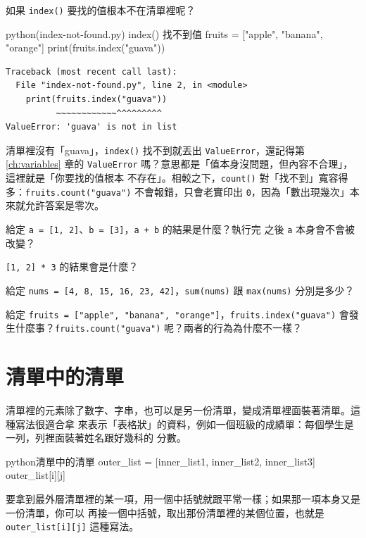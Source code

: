 如果 \texttt{index()} 要找的值根本不在清單裡呢？

\begin{example}{python}{(index-not-found.py) index() 找不到值}
fruits = ["apple", "banana", "orange"]
print(fruits.index("guava"))
\end{example}

\begin{verbatim}
Traceback (most recent call last):
  File "index-not-found.py", line 2, in <module>
    print(fruits.index("guava"))
          ~~~~~~~~~~~~^^^^^^^^^
ValueError: 'guava' is not in list
\end{verbatim}

清單裡沒有「guava」，\texttt{index()} 找不到就丟出 \texttt{ValueError}，還記得第 \ref{ch:variables} 章的
\texttt{ValueError} 嗎？意思都是「值本身沒問題，但內容不合理」，這裡就是「你要找的值根本
不存在」。相較之下，\texttt{count()} 對「找不到」寬容得多：\texttt{fruits.count("guava")}
不會報錯，只會老實印出 \texttt{0}，因為「數出現幾次」本來就允許答案是零次。

\begin{drills}[label=drills:list-tools]
\item 給定 \texttt{a = [1, 2]}、\texttt{b = [3]}，\texttt{a + b} 的結果是什麼？執行完
之後 \texttt{a} 本身會不會被改變？
\item \texttt{[1, 2] * 3} 的結果會是什麼？
\item 給定 \texttt{nums = [4, 8, 15, 16, 23, 42]}，\texttt{sum(nums)} 跟
\texttt{max(nums)} 分別是多少？
\item 給定 \texttt{fruits = ["apple", "banana", "orange"]}，\texttt{fruits.index("guava")}
會發生什麼事？\texttt{fruits.count("guava")} 呢？兩者的行為為什麼不一樣？
\end{drills}

\section{清單中的清單}
\label{sec:nested-list}

清單裡的元素除了數字、字串，也可以是另一份清單，變成清單裡面裝著清單。這種寫法很適合拿
來表示「表格狀」的資料，例如一個班級的成績單：每個學生是一列，列裡面裝著姓名跟好幾科的
分數。

\begin{code}{python}{清單中的清單}
outer_list = [inner_list1, inner_list2, inner_list3]
outer_list[i][j]
\end{code}

要拿到最外層清單裡的某一項，用一個中括號就跟平常一樣；如果那一項本身又是一份清單，你可以
再接一個中括號，取出那份清單裡的某個位置，也就是 \texttt{outer\_list[i][j]} 這種寫法。

